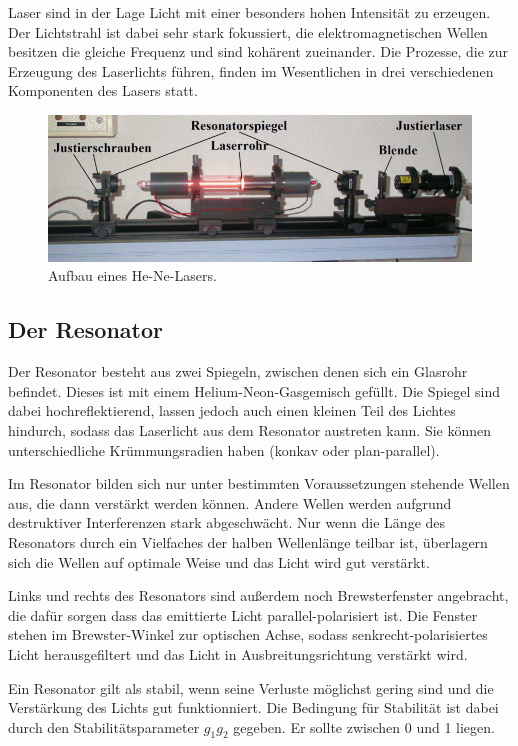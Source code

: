 Laser sind in der Lage Licht mit einer besonders hohen Intensität zu erzeugen. Der Lichtstrahl ist dabei sehr stark fokussiert,
die elektromagnetischen Wellen besitzen die gleiche Frequenz und sind kohärent zueinander. Die Prozesse, die zur
Erzeugung des Laserlichts führen, finden im Wesentlichen in drei verschiedenen Komponenten des Lasers statt.

\begin{figure}
\centering
\includegraphics[width=\textwidth]{laseraufbau.png}
\caption{Aufbau eines He-Ne-Lasers.\cite[3]{anleitung}}
\label{fig:laseraufbau}
\end{figure}

\subsection{Der Resonator}

Der Resonator besteht aus zwei Spiegeln, zwischen denen sich ein Glasrohr befindet. Dieses ist mit einem Helium-Neon-Gasgemisch
gefüllt. Die Spiegel sind dabei hochreflektierend, lassen jedoch auch einen kleinen Teil des Lichtes hindurch, sodass das
Laserlicht aus dem Resonator austreten kann. Sie können unterschiedliche Krümmungsradien haben (konkav oder plan-parallel).

Im Resonator bilden sich nur unter bestimmten Voraussetzungen stehende Wellen aus, die dann verstärkt werden können.
Andere Wellen werden aufgrund destruktiver Interferenzen stark abgeschwächt. Nur wenn die Länge des Resonators durch ein
Vielfaches der halben Wellenlänge teilbar ist, überlagern sich die Wellen auf optimale Weise und das Licht wird gut verstärkt.

Links und rechts des Resonators sind außerdem noch Brewsterfenster angebracht, die dafür sorgen dass das emittierte Licht
parallel-polarisiert ist. Die Fenster stehen im Brewster-Winkel zur optischen Achse, sodass senkrecht-polarisiertes
Licht herausgefiltert und das Licht in Ausbreitungsrichtung verstärkt wird.

Ein Resonator gilt als stabil, wenn seine Verluste möglichst gering sind und die Verstärkung des Lichts gut funktionniert.
Die Bedingung für Stabilität ist dabei durch den Stabilitätsparameter $g_1g_2$ gegeben. Er sollte zwischen 0 und 1 liegen.

